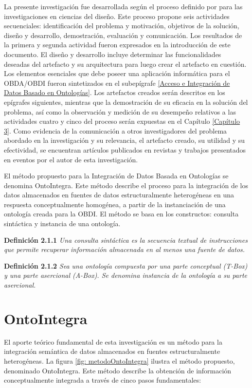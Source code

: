 La presente investigación fue desarrollada según el proceso definido por \cite{Peffers2006} para las investigaciones en ciencias del diseño. Este proceso propone seis actividades secuenciales: identificación del problema y motivación, objetivos de la solución, diseño y desarrollo, demostración, evaluación y comunicación. Los resultados de la primera y segunda actividad fueron expresados en la introducción de este documento. El diseño y desarrollo incluye determinar las funcionalidades deseadas del artefacto y su arquitectura para luego crear el artefacto en cuestión. Los elementos esenciales que debe poseer una aplicación informática para el OBDA/OBDI fueron sintetizados en el subepígrafe \ref{Acceso e Integración de Datos Basado en Ontologías}. Los artefactos
creados serán descritos en los epígrafes siguientes, mientras que la demostración de su eficacia en la solución del problema, así como la observación y medición de su desempeño relativos a las actividades cuatro y cinco del proceso serán expuestas en el Capítulo \ref{Capítulo 3}. Como evidencia de la comunicación a otros investigadores del problema abordado en la investigación y su relevancia, el artefacto creado, su utilidad y su efectividad, se encuentran artículos publicados en revistas y trabajos presentados en eventos por el autor de esta investigación.

El método propuesto para la Integración de Datos Basada en Ontologías se denomina OntoIntegra. Este método describe el proceso para la integración de los datos almacenados en fuentes de datos estructuralmente heterogéneas en una respuesta conceptualmente homogénea, a partir de la instanciación de una ontología creada para la OBDI. El método se basa en los constructos: consulta sintáctica y instancia de una ontología.

\textbf{Definición 2.1.1} \textit{Una consulta sintáctica es la secuencia textual de instrucciones que permite recuperar información almacenada en al menos una fuente de datos.}

\textbf{Definición 2.1.2} \textit{Sea una ontología compuesta por una parte conceptual (T-Box) y una parte asercional (A-Box). Se denomina instancia de la ontología a su parte asercional.}

\section{OntoIntegra}
El aporte teórico fundamental de esta investigación es un método para la integración semántica de datos almacenados en fuentes estructuralmente heterogéneas. La figura \ref{fig: metodoOntoIntegra} ilustra el método propuesto, denominado OntoIntegra. Este método describe la obtención de información conceptualmente integrada a través de cinco pasos fundamentales:

